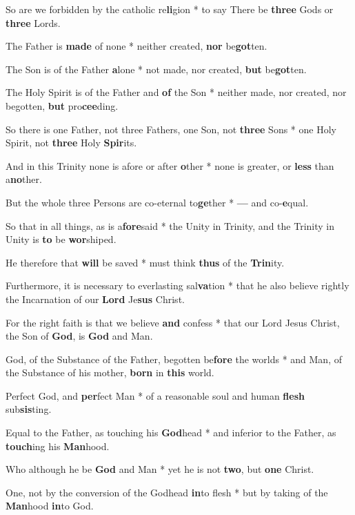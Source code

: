 \begin{multicols}{2}
	So are we forbidden by the catholic re\textbf{li}gion * to say There be \textbf{three} Gods or \textbf{three} Lords. 
	
	The Father is \textbf{made} of none * neither created, \textbf{nor} be\textbf{got}ten.
	
	The Son is of the Father \textbf{a}lone * not made, nor created, \textbf{but} be\textbf{got}ten.
	
	The Holy Spirit is of the Father and \textbf{of} the Son * neither made, nor created, nor begotten, \textbf{but} pro\textbf{cee}ding.
	
	So there is one Father, not three Fathers, one Son, not \textbf{three} Sons * one Holy Spirit, not \textbf{three} Holy \textbf{Spir}its.
	
	And in this Trinity none is afore or after \textbf{o}ther * none is greater, or \textbf{less} than a\textbf{no}ther.
	
	But the whole three Persons are co-eternal to\textbf{ge}ther * \textbf{---} and co-\textbf{e}qual.
	
	So that in all things, as is a\textbf{fore}said * the Unity in Trinity, and the Trinity in Unity is \textbf{to} be \textbf{wor}shiped.
	
	He therefore that \textbf{will} be saved * must think \textbf{thus} of the \textbf{Trin}ity.
	
	Furthermore, it is necessary to everlasting sal\textbf{va}tion * that he also believe rightly the Incarnation of our \textbf{Lord} Je\textbf{sus} Christ.
	
	For the right faith is that we believe \textbf{and} confess * that our Lord Jesus Christ, the Son of \textbf{God}, is \textbf{God} and Man.
	
	God, of the Substance of the Father, begotten be\textbf{fore} the worlds * and Man, of the Substance of his mother, \textbf{born} in \textbf{this} world.
	
	Perfect God, and \textbf{per}fect Man * of a reasonable soul and human \textbf{flesh} sub\textbf{sis}ting.
	
	Equal to the Father, as touching his \textbf{God}head * and inferior to the Father, as \textbf{touch}ing his \textbf{Man}hood.
	
	Who although he be \textbf{God} and Man * yet he is not \textbf{two}, but \textbf{one} Christ.
	
	One, not by the conversion of the Godhead \textbf{in}to flesh * but by taking of the \textbf{Man}hood \textbf{in}to God.
	

\end{multicols}
